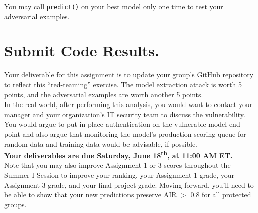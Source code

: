 \documentclass[fleqn]{article}
\begin{document}
\noindent You may call \texttt{predict()} on your best model only one time to test your adversarial examples.

\section{Submit Code Results.}

Your deliverable for this assignment is to update your group's GitHub repository to reflect this ``red-teaming'' exercise. The model extraction attack is worth 5 points, and the adversarial examples are worth another 5 points. \\

\noindent In the real world, after performing this analysis, you would want to contact your manager and your organization's IT security team to discuss the vulnerability. You would argue to put in place authentication on the vulnerable model end point and also argue that monitoring the model's production scoring queue for random data and training data would be advisable, if possible.\\

\noindent \textbf{Your deliverables are due Saturday, June 18\textsuperscript{th}, at 11:00 AM ET.}\\

\noindent Note that you may also improve Assignment 1 or 3 scores throughout the Summer I Session to improve your ranking, your Assignment 1 grade, your Assignment 3 grade, and your final project grade. Moving forward, you'll need to be able to show that your new predictions preserve AIR $>$ 0.8 for all protected groups.
\end{document}
